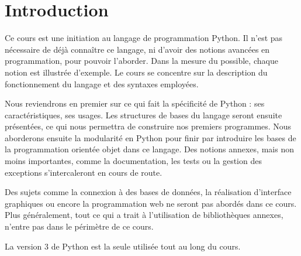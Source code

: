 \documentclass[12pt, a4paper]{article}
\begin{document}
\setcounter{tocdepth}{1}
\renewcommand{\partname}{Partie}
\tableofcontents



\newpage
\part*{Introduction}
Ce cours est une initiation au langage de programmation Python. Il n'est pas nécessaire de déjà connaître ce langage, ni d'avoir des notions avancées en programmation, pour pouvoir l'aborder. Dans la mesure du possible, chaque notion est illustrée d'exemple. Le cours se concentre sur la description du fonctionnement du langage et des syntaxes employées.

Nous reviendrons en premier sur ce qui fait la spécificité de Python : ses caractéristiques, ses usages. Les structures de bases du langage seront ensuite présentées, ce qui nous permettra de construire nos premiers  programmes. Nous aborderons ensuite la modularité en Python pour finir par introduire les bases de la programmation orientée objet dans ce langage. Des notions annexes, mais non moins importantes, comme la documentation, les tests ou la gestion des exceptions s’intercaleront en cours de route.

Des sujets comme la connexion à des bases de données, la réalisation d'interface graphiques ou encore la programmation web ne seront pas abordés dans ce cours. Plus généralement, tout ce qui a trait à l'utilisation de bibliothèques annexes, n'entre pas dans le périmètre de ce cours.

La version 3 de Python est la seule utilisée tout au long du cours.
 
\vspace{2cm}
\end{document}
